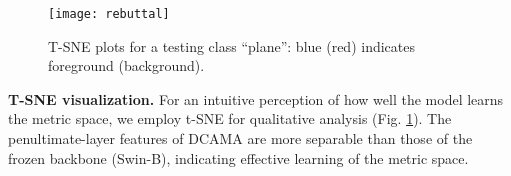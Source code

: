 \documentclass[runningheads,table,xcdraw]{llncs}
\begin{document}
\begin{figure}[h]
  \centering
\texttt{[image: rebuttal]}
   \caption{T-SNE plots for a testing class ``plane'': blue (red) indicates foreground (background).}
   \label{fig:t-SNE}
\end{figure}

{\color{purple}\textbf{T-SNE visualization.}
For an intuitive perception of how well the
model learns the metric space, we employ t-SNE for qualitative analysis (Fig. \ref{fig:t-SNE}).
The penultimate-layer features of DCAMA are more separable than those of the frozen backbone (Swin-B), indicating effective learning of the metric space.}
\end{document}
